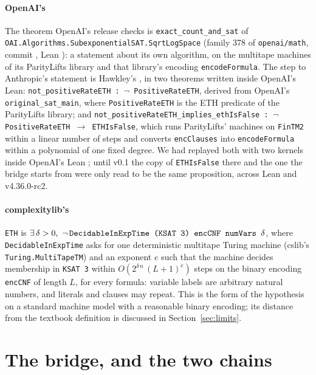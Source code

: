\documentclass[preprint,11pt,authoryear,a4paper]{elsarticle}
\newcommand{\lean}[1]{\texttt{#1}}
\begin{document}
\paragraph{OpenAI's} The theorem OpenAI's release checks is \lean{exact\_count\_and\_sat} of \lean{OAI.Algorithms.\allowbreak SubexponentialSAT.\allowbreak SqrtLogSpace} (family 378 of \lean{openai/math}, commit \EcOpenAICommit, Lean \EcOpenAILean): a statement about its own algorithm, on the multitape machines of its ParityLifts library and that library's encoding \lean{encodeFormula}. The step to Anthropic's statement is Hawkley's \citep{Hawkley26}, in two theorems written inside OpenAI's Lean: \lean{not\_positiveRateETH : $\neg$\,PositiveRateETH}, derived from OpenAI's \lean{original\_sat\_main}, where \lean{PositiveRateETH} is the ETH predicate of the ParityLifts library; and \lean{not\_positiveRateETH\_implies\_ethIsFalse : $\neg$\,PositiveRateETH $\to$ ETHIsFalse}, which runs ParityLifts' machines on \lean{FinTM2} within a linear number of steps and converts \lean{encClauses} into \lean{encodeFormula} within a polynomial of one fixed degree. We had replayed both with two kernels inside OpenAI's Lean \citep{CMEth}; until v0.1 the copy of \lean{ETHIsFalse} there and the one the bridge starts from were only read to be the same proposition, across Lean \EcOpenAILean{} and v4.36.0-rc2.

\paragraph{complexitylib's} \lean{ETH} is $\exists\,\delta>0,\ \neg\,\text{\lean{DecidableInExpTime (KSAT 3) encCNF numVars $\delta$}}$, where \lean{DecidableInExpTime} asks for one deterministic multitape Turing machine (cslib's \lean{Turing.MultiTapeTM}) and an exponent $e$ such that the machine decides membership in \lean{KSAT 3} within $O(2^{\delta\,n}\,(L+1)^{e})$ steps on the binary encoding \lean{encCNF} of length $L$, for every formula: variable labels are arbitrary natural numbers, and literals and clauses may repeat. This is the form of the hypothesis on a standard machine model with a reasonable binary encoding; its distance from the textbook definition is discussed in Section~\ref{sec:limits}.

\section{The bridge, and the two chains}\label{sec:bridge}
\end{document}
